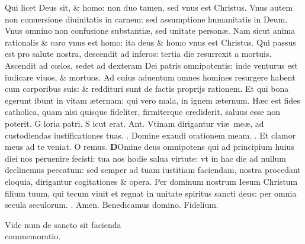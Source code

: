 \documentclass[a5paper,10pt]{book}
\def\ae{æ}
\def\oe{œ}
\begin{document}
\begin{multicols*}{2}
\newline \color{red} Q\color{black}ui licet Deus sit, \& homo: non duo tamen, sed vnus est Christus.
\newline \color{red} V\color{black}nus autem non conuersione diuinitatis in carnem: sed assumptione humanitatis in Deum.
\newline \color{red} V\color{black}nus omnino non confusione substanti\ae , sed unitate person\ae .
\newline \color{red} N\color{black}am sicut anima rationalis \& caro vnus est homo: ita deus \& homo vnus est Christus.
\newline \color{red} Q\color{black}ui passus est pro salute nostra, descendit ad inferos: tertia die resurrexit a mortuis.
\newline \color{red} A\color{black}scendit ad c\oe los, sedet ad dexteram Dei patris omnipotentis: inde venturus est iudicare viuos, \& mortuos.
\newline \color{red} A\color{black}d cuius aduentum omnes homines resurgere habent cum corporibus suis: \& reddituri sunt de factis proprijs rationem.
\newline \color{red} E\color{black}t qui bona egerunt ibunt in vitam \ae ternam: qui vero mala, in ignem \ae ternum.
\newline \color{red} H\color{black}\ae c est fides catholica, quam nisi quisque fideliter, firmiterque crediderit, saluus esse non poterit.
\newline \color{red} G\color{black} loria patri. \color{red} S\color{black} icut erat. \color{red} Ant. \color{black} Vtinam dirigantur vi\ae \ me\ae , ad custodiendas iustificationes tuas. \color{red} \Vbar . \color{black} Domine exaudi orationem meam. \color{red} \Rbar . \color{black} Et clamor meus ad te veniat.
\newline \color{red} O\color{black} remus.
\lettrine[lines=2]{\bfseries \color{red} D}{}Omine deus omnipotens qui ad principium huius diei nos peruenire fecisti: tua nos hodie salua virtute: vt in hac die ad nullum declinemus peccatum: sed semper ad tuam iustitiam faciendam, nostra procedant eloquia, dirigantur cogitationes \& opera. Per dominum nostrum Iesum Christum filium tuum, qui tecum viuit et regnat in unitate spiritus sancti deus: per omnia secula seculorum. \color{red} \Rbar . \color{black} Amen. Benedicamus domino. Fidelium.
\vspace{-1em}
\begin{center} \color{red}
Vide num de sancto sit facienda\\commemoratio.

\end{center}
\end{multicols*}
\end{document}
